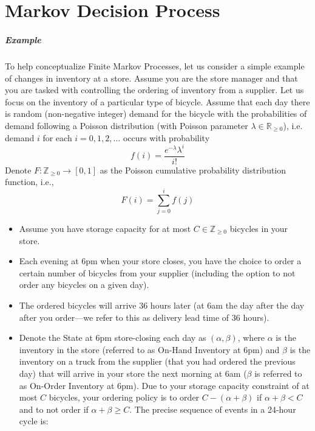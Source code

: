 \chapter{Markov Decision Process}

\paragraph{Example}

To help conceptualize Finite Markov Processes, let us consider a simple example of changes in inventory at a store. Assume you are the store manager and that you are tasked with controlling the ordering of inventory from a supplier. Let us focus on the inventory of a particular type of bicycle. Assume that each day there is random (non-negative integer) demand for the bicycle with the probabilities of demand following a Poisson distribution (with Poisson parameter $\lambda \in \mathbb{R}_{\geq 0}$), i.e. demand $i$ for each $i = 0, 1, 2, \ldots$ occurs with probability
$$f(i) = \frac {e^{-\lambda} \lambda^i} {i!}$$
Denote $F: \mathbb{Z}_{\geq 0} \rightarrow [0, 1]$ as the Poisson cumulative probability distribution function, i.e.,
 $$F(i) = \sum_{j=0}^i f(j)$$
 \begin{itemize}
	 \item Assume you have storage capacity for at most $C \in \mathbb{Z}_{\geq 0}$ bicycles in your store. 
	 \item Each evening at 6pm when your store closes, you have the choice to order a certain number of bicycles from your supplier (including the option to not order any bicycles on a given day). 
	 \item The ordered bicycles will arrive 36 hours later (at 6am the day after the day after you order—we refer to this as delivery lead time of 36 hours). 
	 \item Denote the State at 6pm store-closing each day as $(\alpha, \beta)$, where $\alpha$ is the inventory in the store (referred to as On-Hand Inventory at 6pm) and $\beta$ is the inventory on a truck from the supplier (that you had ordered the previous day) that will arrive in your store the next morning at 6am ($\beta$ is referred to as On-Order Inventory at 6pm). Due to your storage capacity constraint of at most $C$ bicycles, your ordering policy is to order $C-(\alpha + \beta)$ if $\alpha + \beta < C$ and to not order if $\alpha + \beta \geq C$. The precise sequence of events in a 24-hour cycle is:
 \end{itemize}
 
